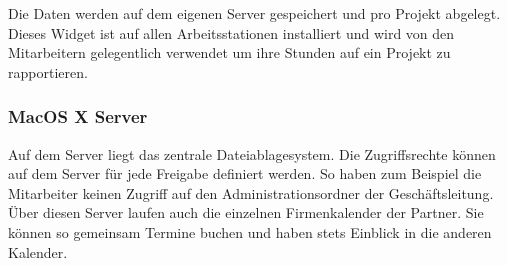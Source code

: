 Die Daten werden auf dem
eigenen Server gespeichert und pro Projekt abgelegt. Dieses Widget ist auf allen
Arbeitsstationen installiert und wird von den Mitarbeitern gelegentlich verwendet
um ihre Stunden auf ein Projekt zu rapportieren.

\subsubsection{MacOS X Server}
Auf dem Server liegt das zentrale Dateiablagesystem. Die Zugriffsrechte können
auf dem Server für jede Freigabe definiert werden. So haben zum Beispiel
die Mitarbeiter keinen Zugriff auf den Administrationsordner der Geschäftsleitung.
Über diesen Server laufen auch die einzelnen Firmenkalender der Partner. Sie
können so gemeinsam Termine buchen und haben stets Einblick in die anderen
Kalender.